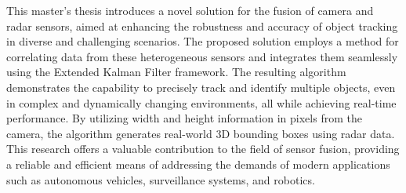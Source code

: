 
\begin{enAbstract}

    This master's thesis introduces a novel solution for the fusion of camera and radar sensors, 
    aimed at enhancing the robustness and accuracy of object tracking in diverse and challenging scenarios. 
    The proposed solution employs a method for correlating data from these heterogeneous sensors 
    and integrates them seamlessly using the Extended Kalman Filter framework. 
    The resulting algorithm demonstrates the capability to precisely track and identify multiple objects, 
    even in complex and dynamically changing environments, all while achieving real-time performance.
    By utilizing width and height information in pixels from the camera,
     the algorithm generates real-world 3D bounding boxes using radar data. 
    This research offers a valuable contribution to the field of sensor fusion, providing a reliable 
    and efficient means of addressing the demands of modern applications such as autonomous vehicles, surveillance systems, and robotics.
    

    \enAbsKeywords
\end{enAbstract}

